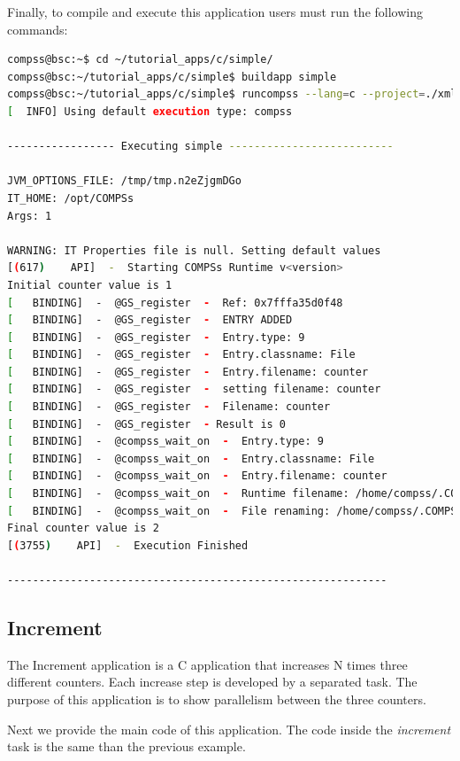 Finally, to compile and execute this application users must run the following commands:

\begin{lstlisting}[language=bash]
compss@bsc:~$ cd ~/tutorial_apps/c/simple/
compss@bsc:~/tutorial_apps/c/simple$ buildapp simple
compss@bsc:~/tutorial_apps/c/simple$ runcompss --lang=c --project=./xml/project.xml --resources=./xml/resources.xml ~/tutorial_apps/c/simple/master/simple 1
[  INFO] Using default execution type: compss

----------------- Executing simple --------------------------

JVM_OPTIONS_FILE: /tmp/tmp.n2eZjgmDGo
IT_HOME: /opt/COMPSs
Args: 1
 
WARNING: IT Properties file is null. Setting default values
[(617)    API]  -  Starting COMPSs Runtime v<version>
Initial counter value is 1
[   BINDING]  -  @GS_register  -  Ref: 0x7fffa35d0f48
[   BINDING]  -  @GS_register  -  ENTRY ADDED
[   BINDING]  -  @GS_register  -  Entry.type: 9
[   BINDING]  -  @GS_register  -  Entry.classname: File
[   BINDING]  -  @GS_register  -  Entry.filename: counter
[   BINDING]  -  @GS_register  -  setting filename: counter
[   BINDING]  -  @GS_register  -  Filename: counter
[   BINDING]  -  @GS_register  - Result is 0
[   BINDING]  -  @compss_wait_on  -  Entry.type: 9
[   BINDING]  -  @compss_wait_on  -  Entry.classname: File
[   BINDING]  -  @compss_wait_on  -  Entry.filename: counter
[   BINDING]  -  @compss_wait_on  -  Runtime filename: /home/compss/.COMPSs/simple_01/tmpFiles/d1v2_1479141705574.IT
[   BINDING]  -  @compss_wait_on  -  File renaming: /home/compss/.COMPSs/simple_01/tmpFiles/d1v2_1479141705574.IT to counter
Final counter value is 2
[(3755)    API]  -  Execution Finished

------------------------------------------------------------
\end{lstlisting}


\subsection{Increment}
The Increment application is a C application that increases N times three different counters. Each increase step is developed by a separated task. The
purpose of this application is to show parallelism between the three counters.

Next we provide the main code of this application. The code inside the \textit{increment} task is the same than the previous example. 


